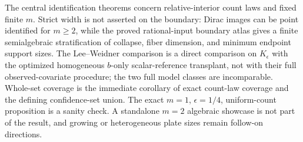 The central identification theorems concern relative-interior count laws and fixed finite \(m\). Strict width is not asserted on the boundary: Dirac images can be point identified for \(m\geq2\), while the proved rational-input boundary atlas gives a finite semialgebraic stratification of collapse, fiber dimension, and minimum endpoint support sizes. The Lee--Weidner comparison is a direct comparison on \(K_{\epsilon}\) with the optimized homogeneous \(b\)-only scalar-reference transplant, not with their full observed-covariate procedure; the two full model classes are incomparable. Whole-set coverage is the immediate corollary of exact count-law coverage and the defining confidence-set union. The exact \(m=1\), \(\epsilon=1/4\), uniform-count proposition is a sanity check. A standalone \(m=2\) algebraic showcase is not part of the result, and growing or heterogeneous plate sizes remain follow-on directions.